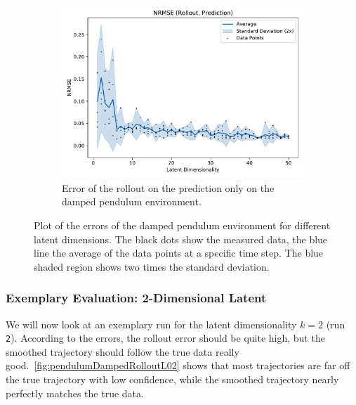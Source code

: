 \begin{figure}
\begin{subfigure}{0.5\linewidth}
					\label{fig:pendulumDampedRmseTrain}
				\end{subfigure}%
				~
				\begin{subfigure}{0.5\linewidth}
					\centering
					\includegraphics[width=\linewidth]{figures/results/pendulum-damped/latent-dim/comparison-rmse-rollout-prediction-normalized-mean-vs-latent-dim.pdf}
					\caption{Error of the rollout on the prediction only on the damped pendulum environment.}
					\label{fig:pendulumDampedRmsePred}
				\end{subfigure}
				\caption{Plot of the errors of the damped pendulum environment for different latent dimensions. The black dots show the measured data, the blue line the average of the data points at a specific time step. The blue shaded region shows two times the standard deviation.}
				\label{fig:pendulumDampedRmse}
			\end{figure}

		\subsubsection{Exemplary Evaluation: 2-Dimensional Latent}
			We will now look at an exemplary run for the latent dimensionality \( k = 2 \) (run \texttt{2}). According to the errors, the rollout error should be quite high, but the smoothed trajectory should follow the true data really good.~\autoref{fig:pendulumDampedRolloutL02} shows that most trajectories are far off the true trajectory with low confidence, while the smoothed trajectory nearly perfectly matches the true data.

